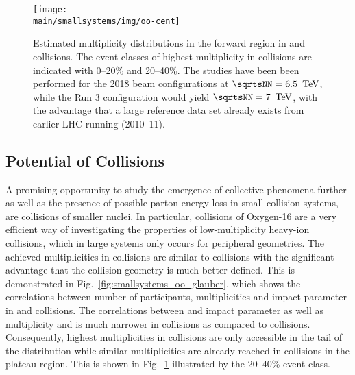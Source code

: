 \documentclass[../report.tex]{subfiles}
\providecommand{\main}{..}
\begin{document}
\begin{figure}[t]
\centering
\texttt{[image: \\main/smallsystems/img/oo-cent]}
\caption{Estimated multiplicity distributions in the forward region in \OO and \pPb collisions. The event classes of highest multiplicity in \OO collisions are indicated with 0--20\% and 20--40\%.
The \OO studies have been been performed for the 2018 beam configurations at $\sqrtsNN = \unit[6.5]{\UTeV}$, while the Run 3 configuration would yield $\sqrtsNN = \unit[7]{\UTeV}$, with the advantage that a large \pp reference data set already exists from earlier LHC running (2010--11).
}
\label{fig:smallsystems_oo_mult}
\end{figure}

\subsection{Potential of \OO Collisions}
\label{sect:smallsystems_OO}

A promising opportunity to study the emergence of collective phenomena further as well as the presence of possible parton energy loss in small collision systems, are collisions of smaller nuclei. 
In particular, collisions of Oxygen-16 are a very efficient way of investigating the properties of low-multiplicity heavy-ion collisions, which in large \AOnA systems only occurs for peripheral geometries.
The achieved multiplicities in \OO collisions are similar to \pPb collisions with the significant advantage that the collision geometry is much better defined.
This is demonstrated in Fig.~\ref{fig:smallsystems_oo_glauber}, which shows the correlations between number of participants, multiplicities and impact parameter in \OO and \pPb collisions. The correlations between \Npart and impact parameter as well as multiplicity and \Npart is much narrower in \OO collisions as compared to \pPb collisions. Consequently, highest multiplicities in \pPb collisions are only accessible in the tail of the distribution while similar multiplicities are already reached in \OO collisions in the plateau region. This is shown in Fig.~\ref{fig:smallsystems_oo_mult} illustrated by the 20--40\% event class.
\end{document}
